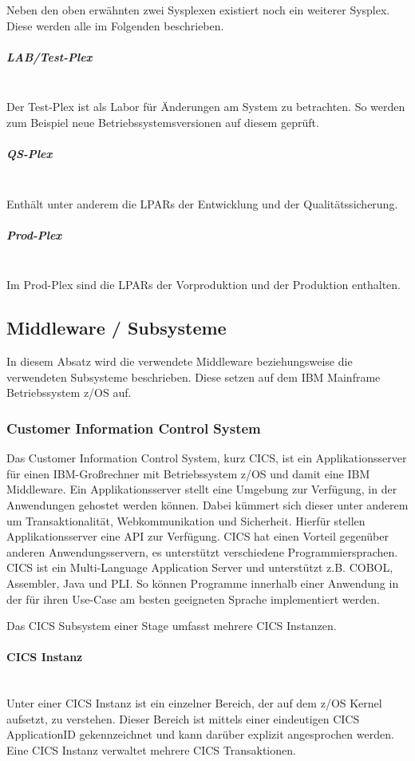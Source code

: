 Neben den oben erwähnten zwei Sysplexen existiert noch ein weiterer Sysplex.
Diese werden alle im Folgenden beschrieben.

\subparagraph{\glqq LAB/Test-Plex\grqq}~\\
Der Test-Plex ist als Labor für Änderungen am System zu betrachten.
So werden zum Beispiel neue Betriebssystemsversionen auf diesem geprüft.

\subparagraph{\glqq QS-Plex\grqq}~\\
Enthält unter anderem die LPARs der Entwicklung und der Qualitätssicherung.

\subparagraph{\glqq Prod-Plex\grqq}~\\
Im Prod-Plex sind die LPARs der Vorproduktion und der Produktion enthalten.

\subsection{Middleware / Subsysteme}
In diesem Absatz wird die verwendete Middleware beziehungsweise die verwendeten Subsysteme beschrieben.
Diese setzen auf dem IBM Mainframe Betriebssystem z/OS auf.

\subsubsection{Customer Information Control System}\label{cics}
Das Customer Information Control System, kurz CICS, ist ein Applikationsserver für einen IBM-Großrechner mit Betriebssystem z/OS und damit eine IBM Middleware.
Ein Applikationsserver stellt eine Umgebung zur Verfügung, in der Anwendungen gehostet werden können.
Dabei kümmert sich dieser unter anderem um Transaktionalität, Webkommunikation und Sicherheit.
Hierfür stellen Applikationsserver eine API zur Verfügung.
CICS hat einen Vorteil gegenüber anderen Anwendungsservern, es unterstützt verschiedene Programmiersprachen.
CICS ist ein Multi-Language Application Server und unterstützt z.B. COBOL, Assembler, Java und PLI.
So können Programme innerhalb einer Anwendung in der für ihren Use-Case am besten geeigneten Sprache implementiert werden.
\cite{Rayns.2011}

Das CICS Subsystem einer Stage umfasst mehrere CICS Instanzen.

\paragraph{CICS Instanz} ~\\
Unter einer CICS Instanz ist ein einzelner Bereich, der auf dem z/OS Kernel aufsetzt, zu verstehen.
Dieser Bereich ist mittels einer eindeutigen CICS ApplicationID gekennzeichnet und kann darüber explizit angesprochen werden.
Eine CICS Instanz verwaltet mehrere CICS Transaktionen.

